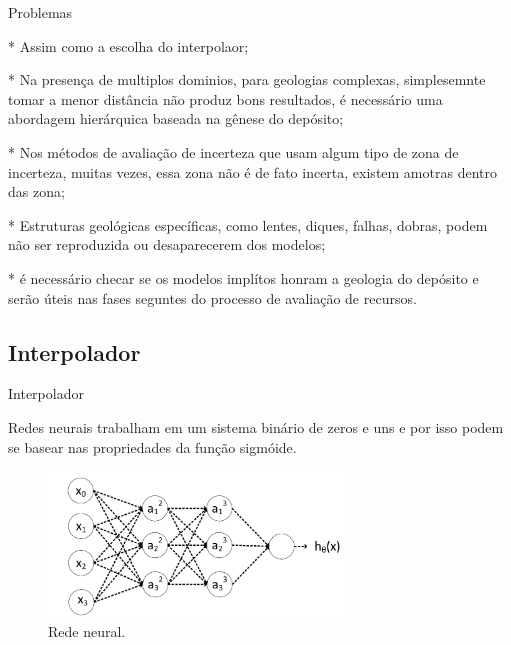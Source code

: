 \documentclass[aspectratio=169]{beamer}
\begin{document}
\begin{frame}[allowframebreaks]{Problemas}
{	* Assim como a escolha do interpolaor;
	
	* Na presença de multiplos dominios, para geologias complexas, simplesemnte tomar a menor distância não produz bons resultados, é necessário uma abordagem hierárquica baseada na gênese do depósito;
	
	* Nos métodos de avaliação de incerteza que usam algum tipo de zona de incerteza, muitas vezes, essa zona não é de fato incerta, existem amotras dentro das zona;
	
	* Estruturas geológicas específicas, como lentes, diques, falhas, dobras, podem não ser reproduzida ou desaparecerem dos modelos;
	
	* é necessário checar se os modelos implítos honram a geologia do depósito e serão úteis nas fases seguntes do processo de avaliação de recursos.}
\end{frame}

\subsection{Interpolador}

\begin{frame}{Interpolador}

Redes neurais trabalham em um sistema binário de zeros e uns e por isso podem se basear nas propriedades da função sigmóide.

\begin{figure}[H]
	\caption{\label{nn_ex}Rede neural.}
	\begin{center}
		\includegraphics[width=0.7\textwidth]{capitulo_3/NN_ex.png}
	\end{center}
\end{figure}
\end{frame}
\end{document}
